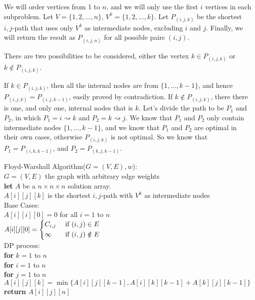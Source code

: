 \documentclass[twoside]{article}
\newcommand{\pc}[1]{\mbox{\textbf{#1}}} %
\begin{document}
We will order vertices from 1 to $n$, and we will only use the first $i$ vertices in each subproblem. Let $V = \{1, 2, ..., n\}$, $V^k = \{1, 2, ..., k\}$. Let $P_{(i, j, k)}$ be the shortest $i,j$-path that uses only $V^k$ as intermediate nodes, excluding $i$ and $j$. Finally, we will return the result as $P_{(i, j, n)}$ for all possible pairs $(i, j)$. 

There are two possibilities to be considered, either the vertex $k \in P_{(i, j, k)}$ or $k \notin P_{(i, j, k)}$. 

If $k \in P_{(i, j, k)}$, then all the internal nodes are from $\{1, ..., k-1\}$, and hence $P_{(i, j, k)} = P_{(i, j, k-1)}$, easily proved by contradiction. If $k \notin P_{(i, j, k)}$, there there is one, and only one, internal nodes that is $k$. Let's divide the path to be $P_1$ and $P_2$, in which $P_1 = i \rightsquigarrow k$ and $P_2 = k \rightsquigarrow j$. We know that $P_1$ and $P_2$ only contain intermediate nodes $\{1, ..., k-1\}$, and we know that $P_1$ and $P_2$ are optimal in their own cases, otherwise $P_{(i, j, k)}$ is not optimal. So we know that $P_1 = P_{(i, k, k-1)}$, and $P_2 = P_{(k, j, k-1)}$. 

\begin{algorithme}
	Floyd-Warshall Algorithm($G = (V, E), w$):\\
	$G = (V, E)$ the graph with arbitrary edge weights\\
	\>\pc{let} $A$ be a $n \times n \times n$ solution array. \\
	\>$A[i][j][k]$ is the shortest $i,j$-path with $V^k$ as intermediate nodes\\
	\>Base Cases:\\
	\>$A[i][i][0] = 0$ for all $i = 1$ to $n$\\
	\>$A[i][j][0] = \begin{dcases}
	C_{i,j} &\text{ if } (i, j) \in E\\
	\infty & \text{ if } (i, j) \notin E
	\end{dcases}$\\
	\>DP process: \\
	\>\pc{for} $k=1$ to $n$\\
	\>\>\pc{for} $i=1$ to $n$\\
	\>\>\>\pc{for} $j=1$ to $n$\\
	\>\>\>\>$A[i][j][k] = \min\{A[i][j][k-1], A[i][k][k-1]+A[k][j][k-1]\}$\\
	\>\pc{return} $A[i][j][n]$
\end{algorithme}
\end{document}
